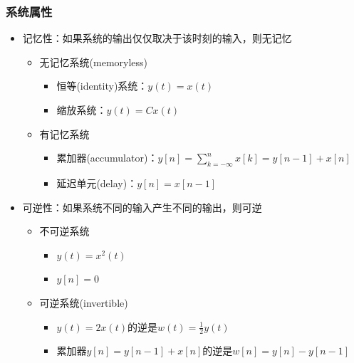 \documentclass[CJKutf8,dvipsnames,table]{beamer}
\begin{document}
\begin{CJK*}{UTF8}{song}
  \begin{frame}
    \frametitle{系统属性}
    \begin{itemize}
    \item 记忆性：如果系统的输出仅仅取决于该时刻的输入，则无记忆
        \begin{itemize}
        \item 无记忆系统(memoryless)
            \begin{itemize}
            \item 恒等(identity)系统：$y(t)=x(t)$
            \item 缩放系统：$y(t)=Cx(t)$
            \end{itemize}
        \item 有记忆系统   
            \begin{itemize}
			\item 累加器(accumulator)：$y[n]=\sum_{k=-\infty}^{n}x[k]=y[n-1]+x[n]$
            \item 延迟单元(delay)：$y[n]=x[n-1]$
            \end{itemize}
        \end{itemize}       
    \item 可逆性：如果系统不同的输入产生不同的输出，则可逆
        \begin{itemize}
        \item 不可逆系统
            \begin{itemize}
            \item $y(t)=x^2(t)$
            \item $y[n]=0$
            \end{itemize}
        \item 可逆系统(invertible)    
            \begin{itemize}
            \item $y(t)=2x(t)$的逆是$w(t)=\frac{1}{2}y(t)$
	   \item 累加器$y[n]=y[n-1]+x[n]$的逆是$w[n]=y[n]-y[n-1]$
            \end{itemize}
        \end{itemize} 
    \end{itemize} 
  \end{frame}


\end{CJK*}
\end{document}

